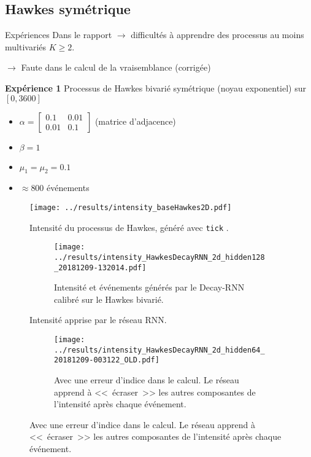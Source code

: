 \documentclass[../main.tex]{subfiles}
\begin{document}
\subsection{Hawkes symétrique}

\begin{frame}{Expériences}
Dans le rapport $\rightarrow$ difficultés à apprendre des processus au moins multivariés $K\geq 2$.

$\rightarrow$ Faute dans le calcul de la vraisemblance (corrigée)\pause

\textbf{Expérience 1} Processus de Hawkes bivarié symétrique (noyau exponentiel) sur $[0, 3600]$
\begin{itemize}
	\item $\alpha = \begin{bmatrix}0.1 & 0.01 \\ 0.01 & 0.1\end{bmatrix}$ (matrice d'adjacence)
	\item $\beta = 1$
	\item $\mu_1 = \mu_2 = \num{0.1}$
	\item $\approx 800$ événements
\end{itemize}
\end{frame}

\begin{frame}

\begin{figure}
	\texttt{[image: ../results/intensity\_baseHawkes2D.pdf]}
	\caption{Intensité du processus de Hawkes, généré avec \texttt{tick} \autocite{2017arXiv170703003B}.}
\end{figure}
\end{frame}

\begin{frame}
\begin{figure}
\begin{subfigure}{\linewidth}
	\texttt{[image: ../results/intensity\_HawkesDecayRNN\_2d\_hidden128\_20181209-132014.pdf]}
	\caption{Intensité et événements générés par le Decay-RNN calibré sur le Hawkes bivarié.}
\end{subfigure}
	\caption{Intensité apprise par le réseau RNN.}
\end{figure}
\end{frame}

\begin{frame}
\begin{figure}\ContinuedFloat
\begin{subfigure}{\linewidth}
	\texttt{[image: ../results/intensity\_HawkesDecayRNN\_2d\_hidden64\_20181209-003122\_OLD.pdf]}
	\caption{Avec une erreur d'indice dans le calcul. Le réseau apprend à <<~écraser~>> les autres composantes de l'intensité après chaque événement.}
\end{subfigure}
\end{figure}
\end{frame}
\end{document}
